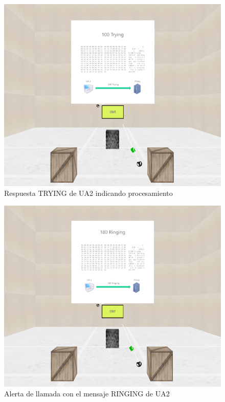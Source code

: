 \documentclass[a4paper, 12pt]{book}
\begin{document}
\begin{figure}
  \centering
  \includegraphics[width=12cm, keepaspectratio]{img/resultados/07-Trying.png}
  \caption{Respuesta TRYING de UA2 indicando procesamiento}
  \label{fig:07-Trying}
\end{figure}

\begin{figure}
  \centering
  \includegraphics[width=12cm, keepaspectratio]{img/resultados/08-Ringing.png}
  \caption{Alerta de llamada con el mensaje RINGING de UA2}
  \label{fig:08-Ringing}
\end{figure}
\end{document}
